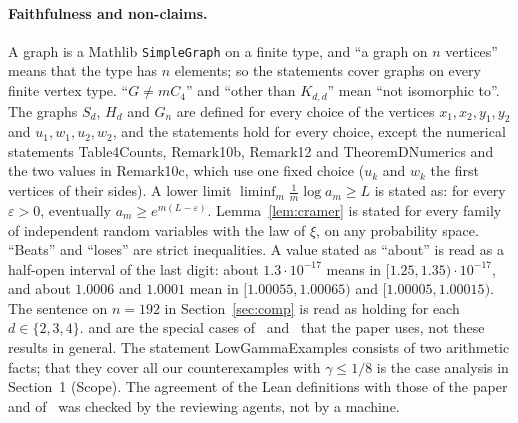 \documentclass[11pt]{article}
\theoremstyle{remark}
\begin{document}
\paragraph{Faithfulness and non-claims.}
A graph is a Mathlib \texttt{SimpleGraph} on a finite type, and ``a graph on
$n$ vertices'' means that the type has $n$ elements; so the statements cover
graphs on every finite vertex type. ``$G\ne mC_4$'' and ``other than
$K_{d,d}$'' mean ``not isomorphic to''. The graphs $S_d$, $H_d$ and $G_n$ are
defined for every choice of the vertices $x_1,x_2,y_1,y_2$ and
$u_1,w_1,u_2,w_2$, and the statements hold for every choice, except the
numerical statements Table4Counts, Remark10b, Remark12 and TheoremDNumerics and
the two values in Remark10c, which use one fixed choice ($u_k$ and $w_k$ the
first vertices of their sides). A lower limit
$\liminf_m\frac1m\log a_m\ge L$ is stated as: for every $\varepsilon>0$,
eventually $a_m\ge e^{m(L-\varepsilon)}$. Lemma~\ref{lem:cramer} is stated for
every family of independent random variables with the law of $\xi$, on any
probability space. ``Beats'' and ``loses'' are strict inequalities. A value
stated as ``about'' is read as a half-open interval of the last digit: about
$1.3\cdot10^{-17}$ means in $[1.25,1.35)\cdot10^{-17}$, and about $1.0006$
and $1.0001$ mean in $[1.00055,1.00065)$ and $[1.00005,1.00015)$. The
sentence on $n=192$ in Section~\ref{sec:comp} is read as holding for each
$d\in\{2,3,4\}$.  and  are the special
cases of~\cite[Corollary~1.15]{sssz} and~\cite[Proposition~2.1]{car} that the
paper uses, not these results in general. The statement LowGammaExamples
consists of two arithmetic facts; that they cover all our counterexamples
with $\gamma\le1/8$ is the case analysis in Section~1 (Scope). The agreement of the Lean
definitions with those of the paper and of~\cite{car} was checked by the
reviewing agents, not by a machine.
\end{document}
